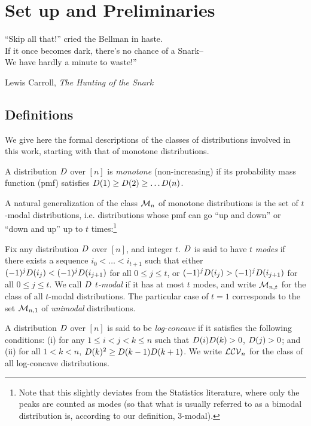 \chapter{Set up and Preliminaries}

\epigraph{``Skip all that!'' cried the Bellman in haste.\\
If it once becomes dark, there's no chance of a Snark--\\
We have hardly a minute to waste!''}{Lewis Carroll, \textit{The Hunting of the Snark}}

\section{Definitions}\label{ssec:class:definitions}

We give here the formal descriptions of the classes of distributions involved in this work, starting with that of monotone distributions.
\begin{definition}[monotone]\label{def:monotone}
A distribution $D$ over $[n]$ is \emph{monotone} (non-increasing) if its probability mass function (pmf) satisfies $D(1) \geq D(2) \geq \dots D(n)$.
\end{definition}
 A natural generalization of the class $\mathcal{M}_{n}$ of monotone distributions is the set of $t$-modal distributions, i.e. distributions whose pmf can go ``up and down'' or ``down and up'' up to $t$ times:\footnote{Note that this slightly deviates from the Statistics literature, where only the peaks are counted as modes (so that what is usually referred to as a bimodal distribution is, according to our definition, $3$-modal).}

\begin{definition}[$t$-modal]\label{def:tmodal}
  Fix any distribution $D$ over $[n]$, and integer $t$. $D$ is said to have $t$ \emph{modes} if there exists a sequence $i_0 < \dots < i_{t+1}$ such 
  that either $(-1)^j D(i_j) < (-1)^j D(i_{j+1})$ for all $0\leq j \leq t$, or $(-1)^j D(i_j) > (-1)^j D(i_{j+1})$ for all $0\leq j \leq t$. We call $D$ \emph{$t$-modal} if it has at most $t$ modes, and write $\mathcal{M}_{n,t}$ for the class of all $t$-modal distributions. The particular case of $t=1$ corresponds to the set $\mathcal{M}_{n,1}$ of \emph{unimodal} distributions.
\end{definition}

\begin{definition}\label{def:logconcave}
  A distribution $D$ over $[n]$ is said to be \emph{log-concave} if it satisfies the following conditions: \textsf{(i)} for any $1 \leq i < j < k \leq n$ such that $D(i)D(k) > 0$, $D(j) > 0$; and \textsf{(ii)} for all $1 < k < n$, $D(k)^2 \geq D(k-1)D(k+1)$. We write $\mathcal{LCV}_{n}$ for the class of all log-concave distributions.
\end{definition}

